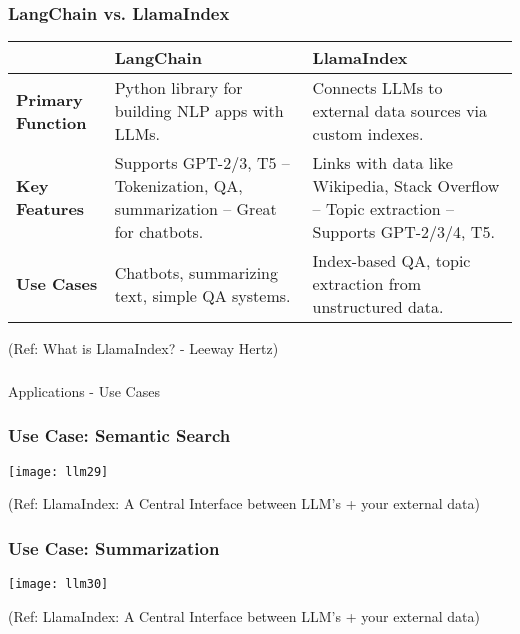 \begin{frame}[fragile]\frametitle{LangChain vs. LlamaIndex}

\begin{tabular}{|p{2cm}|p{4cm}|p{4cm}|}
\hline
\textbf{} & \textbf{LangChain} & \textbf{LlamaIndex} \\
\hline
\textbf{Primary Function} & 
Python library for building NLP apps with LLMs. & 
Connects LLMs to external data sources via custom indexes. \\
\hline
\textbf{Key Features} & 
Supports GPT-2/3, T5 – Tokenization, QA, summarization – Great for chatbots. & 
Links with data like Wikipedia, Stack Overflow – Topic extraction – Supports GPT-2/3/4, T5. \\
\hline
\textbf{Use Cases} & 
Chatbots, summarizing text, simple QA systems. & 
Index-based QA, topic extraction from unstructured data. \\
\hline
\end{tabular}


{\tiny (Ref: What is LlamaIndex? - Leeway Hertz)}

\end{frame}

\begin{frame}[fragile]\frametitle{}
\begin{center}
{\Large Applications - Use Cases}
\end{center}
\end{frame}


\begin{frame}[fragile]\frametitle{Use Case: Semantic Search}

\begin{center}
\texttt{[image: llm29]}

{\tiny (Ref: LlamaIndex: A Central Interface between LLM’s + your external data)}
\end{center}
\end{frame}

\begin{frame}[fragile]\frametitle{Use Case: Summarization}

\begin{center}
\texttt{[image: llm30]}

{\tiny (Ref: LlamaIndex: A Central Interface between LLM’s + your external data)}
\end{center}
\end{frame}


